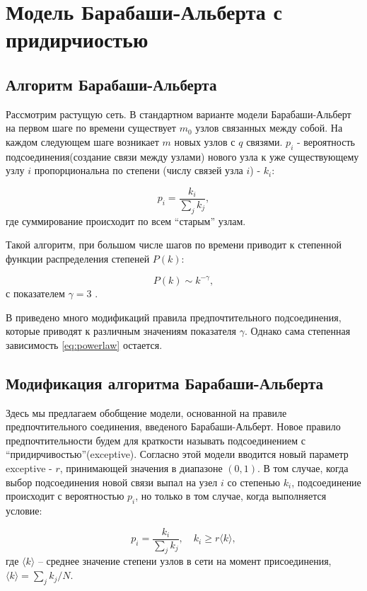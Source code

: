 \documentclass[10pt,aps,pra]{revtex4-1}
\begin{document}
\section{Модель Барабаши-Альберта с придирчиостью}
\subsection{Алгоритм Барабаши-Альберта}
Рассмотрим растущую сеть. В стандартном варианте модели Барабаши-Альберт \cite{AlBa1} на первом шаге по времени существует $m_0$ узлов связанных между собой. На каждом следующем шаге возникает $m$ новых узлов с $q$ связями. $p_i$ - вероятность подсоединения(создание связи между узлами) нового узла к уже существующему узлу $i$ пропорциональна по степени (числу связей узла $i$) - $k_i$:

\begin{equation}
p_i = \frac{k_i}{\sum\limits_{j} k_j},
\end{equation}
где суммирование происходит по всем “старым” узлам.

Такой алгоритм, при большом числе шагов по времени приводит к степенной функции распределения степеней $P(k)$:

\begin{equation}\label{eq:powerlaw}
P(k) \sim k^{-\gamma},
\end{equation}
с показателем $\gamma =3$ \cite{AlBa1}.

В \cite{AlBa2} приведено много модификаций правила предпочтительного подсоединения, которые приводят к различным значениям показателя $\gamma$. Однако сама степенная зависимость \eqref{eq:powerlaw} остается.

\subsection{Модификация алгоритма Барабаши-Альберта}
Здесь мы предлагаем обобщение модели, основанной на правиле предпочтительного соединения, введеного Барабаши-Альберт. Новое правило предпочтительности будем для краткости называть подсоединением с ``придирчивостью''(exceptive). Согласно этой модели вводится новый параметр exceptive - $r$, принимающей значения в диапазоне $(0, 1)$. В том случае, когда выбор подсоединения новой связи выпал на узел $i$ со степенью $k_i$, подсоединение происходит с вероятностью $p_i$, но только в том случае, когда выполняется условие:

\begin{equation}\label{eq:exceptive}
p_i = \frac{k_i}{\sum\limits_{j} k_j},\quad k_i \geq r \langle k \rangle,
\end{equation}
где $\langle k \rangle$ – среднее значение степени узлов в сети на момент присоединения, $\langle k \rangle = \sum\limits_{j}{k_j}/{N}$.
\end{document}

